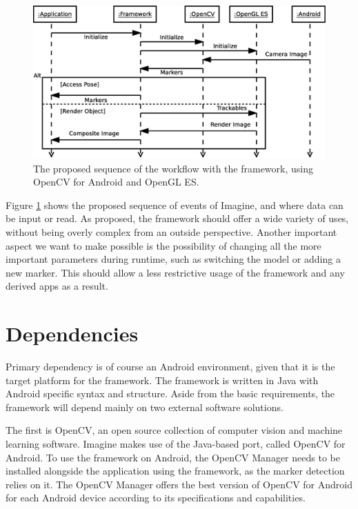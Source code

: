 \begin{figure}
	\centering
	\includegraphics[width=12cm]{img/sequence_access.eps}
	\caption[Access Sequence.]{The proposed sequence of the workflow with the framework, using OpenCV for Android and OpenGL ES.}
	\label{fig:sequence_access}
\end{figure}

Figure \ref{fig:sequence_access} shows the proposed sequence of events of Imagine, and where data can be input or read.
As proposed, the framework should offer a wide variety of uses, without being overly complex from an outside perspective.
Another important aspect we want to make possible is the possibility of changing all the more important parameters during runtime, such as switching the model or adding a new marker.
This should allow a less restrictive usage of the framework and any derived apps as a result.

\section{Dependencies}

Primary dependency is of course an Android environment, given that it is the target platform for the framework.
The framework is written in Java with Android specific syntax and structure.
Aside from the basic requirements, the framework will depend mainly on two external software solutions.

The first is OpenCV\cite{opencv}, an open source collection of computer vision and machine learning software.
Imagine makes use of the Java-based port, called OpenCV for Android.
To use the framework on Android, the OpenCV Manager\cite{opencvmanager} needs to be installed alongside the application using the framework, as the marker detection relies on it.
The OpenCV Manager offers the best version of OpenCV for Android for each Android device according to its specifications and capabilities.

